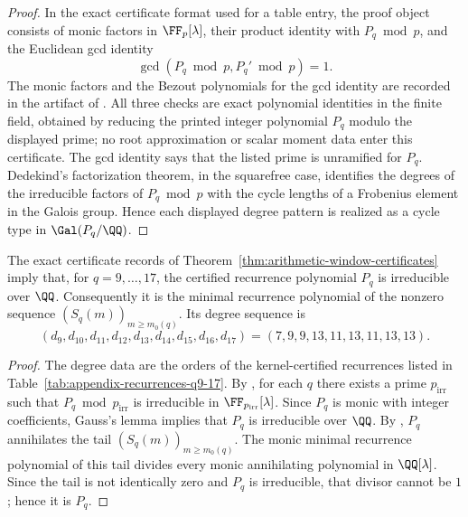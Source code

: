 \begin{proof}
In the exact certificate format used for a table entry, the proof object
consists of monic factors in \(\FF_p[\lambda]\), their product identity with
\(P_q\bmod p\), and the Euclidean gcd identity
\[
  \gcd(P_q\bmod p, P_q'\bmod p)=1.
\]
The monic factors and the Bezout polynomials for the gcd identity are recorded
in the artifact of .  All three
checks are exact polynomial identities in the finite field, obtained by reducing
the printed integer polynomial \(P_q\) modulo the displayed prime; no root
approximation or scalar moment data enter this certificate.  The gcd identity
says that the listed prime is unramified for \(P_q\).  Dedekind's
factorization theorem, in the squarefree case, identifies the degrees of the
irreducible factors of \(P_q\bmod p\) with the cycle lengths of a Frobenius
element in the Galois group.  Hence each displayed degree pattern is realized
as a cycle type in \(\Gal(P_q/\QQ)\).
\end{proof}

\begin{proposition}
\label{prop:irreducibility-window}
The exact certificate records of
Theorem~\ref{thm:arithmetic-window-certificates} imply that, for
\(q=9,\dots,17\), the certified
recurrence polynomial \(P_q\) is
irreducible over \(\QQ\).  Consequently it is the minimal recurrence polynomial
of the nonzero sequence \((S_q(m))_{m\ge m_0(q)}\).  Its degree sequence is
\[
  (d_9,d_{10},d_{11},d_{12},d_{13},d_{14},d_{15},d_{16},d_{17})
  =(7,9,9,13,11,13,11,13,13).
\]
\end{proposition}

\begin{proof}
The degree data are the orders of the kernel-certified recurrences listed in
Table~\ref{tab:appendix-recurrences-q9-17}.  By
, for each \(q\) there exists a prime
\(p_{\mathrm{irr}}\) such that \(P_q\bmod p_{\mathrm{irr}}\) is irreducible in
\(\FF_{p_{\mathrm{irr}}}[\lambda]\).  Since \(P_q\) is monic with integer
coefficients, Gauss's lemma implies that \(P_q\) is irreducible over \(\QQ\).
By , \(P_q\) annihilates the tail
\((S_q(m))_{m\ge m_0(q)}\).  The monic minimal recurrence polynomial of this
tail divides every monic annihilating polynomial in \(\QQ[\lambda]\).  Since
the tail is not identically zero and \(P_q\) is irreducible, that divisor cannot
be \(1\); hence it is \(P_q\).
\end{proof}

